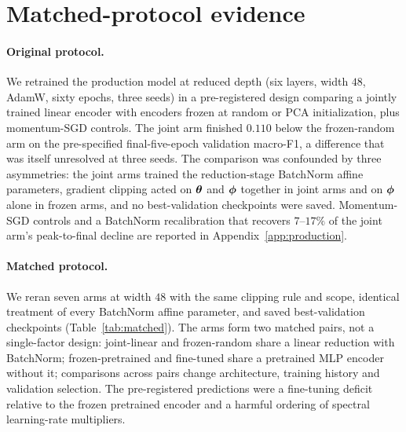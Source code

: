 \section{Matched-protocol evidence}
\label{sec:matched}

\paragraph{Original protocol.}
We retrained the production model at reduced depth (six layers, width $48$,
AdamW, sixty epochs, three seeds) in a pre-registered design comparing a
jointly trained linear encoder with encoders frozen at random or PCA
initialization, plus momentum-SGD controls. The joint arm finished
$0.110$ below the frozen-random arm on the pre-specified final-five-epoch
validation macro-F1, a difference that was itself unresolved at three seeds.
The comparison was confounded by three asymmetries: the joint arms trained
the reduction-stage BatchNorm affine parameters, gradient clipping acted on
${\boldsymbol{\theta}}$ and ${\boldsymbol{\phi}}$ together in joint arms and on ${\boldsymbol{\phi}}$ alone in frozen
arms, and no best-validation checkpoints were saved. Momentum-SGD controls
and a BatchNorm recalibration that recovers $7$--$17\%$ of the joint arm's
peak-to-final decline are reported in Appendix~\ref{app:production}.

\paragraph{Matched protocol.}
We reran seven arms at width $48$ with the same clipping rule and scope,
identical treatment of every BatchNorm affine parameter, and saved
best-validation checkpoints (Table~\ref{tab:matched}). The arms form two
matched pairs, not a single-factor design: joint-linear and frozen-random
share a linear reduction with BatchNorm; frozen-pretrained and fine-tuned
share a pretrained MLP encoder without it; comparisons across pairs change
architecture, training history and validation selection. The
pre-registered predictions were a fine-tuning deficit relative to the frozen
pretrained encoder and a harmful ordering of spectral learning-rate
multipliers.


